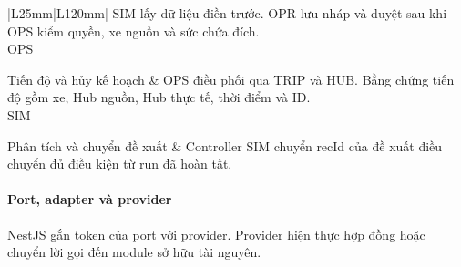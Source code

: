 \begin{longtable}{|L{25mm}|L{120mm}|}
SIM lấy dữ liệu điền trước. OPR lưu nháp và duyệt sau khi OPS kiểm quyền, xe nguồn và sức chứa đích.\\\hline
OPS \par Tiến độ và hủy kế hoạch &
OPS điều phối qua TRIP và HUB. Bằng chứng tiến độ gồm xe, Hub nguồn, Hub thực tế, thời điểm và ID.\\\hline
SIM \par Phân tích và chuyển đề xuất &
Controller SIM chuyển recId của đề xuất điều chuyển đủ điều kiện từ run đã hoàn tất.\\\hline
\end{longtable}

\paragraph{Port, adapter và provider}
\label{sec:final-module-ports}

NestJS gắn token của port với provider. Provider hiện thực hợp đồng hoặc chuyển lời gọi đến module sở hữu tài nguyên.


